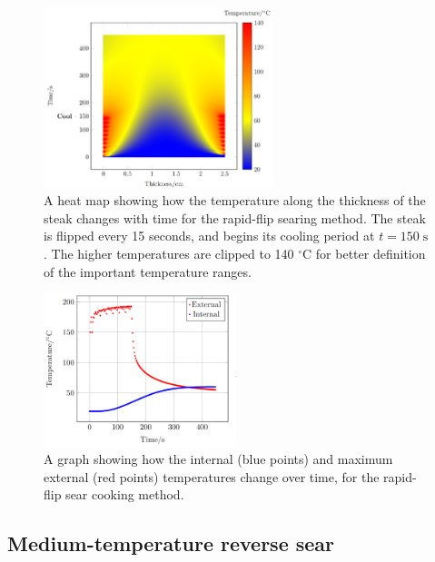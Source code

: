 \documentclass[11pt]{article}
\begin{document}
	\begin{figure}[H]
		\centering
		\includegraphics[width=0.6\textwidth]{./img/rapid-flip-heatmap.png}
		\caption{A heat map showing how the temperature along the thickness of the steak changes with time for the rapid-flip searing method. The steak is flipped every 15 seconds, and begins its cooling period at $t=150\;\mathrm{s}$. The higher temperatures are clipped to 140 $^\circ\text{C}$ for better definition of the important temperature ranges.}
		\label{fig:rapid-flip-heatmap}
	\end{figure}
	
	\begin{figure}[H]
		\centering
		\includegraphics[width=0.5\textwidth]{./img/temps-rapid-sear.png}
		\caption{A graph showing how the internal (blue points) and maximum external (red points) temperatures change over time, for the rapid-flip sear cooking method.}
		\label{fig:rapid-flip-temps}
	\end{figure}
	
	\subsection{Medium-temperature reverse sear}
	
\end{document}

